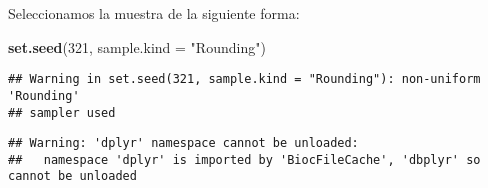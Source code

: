 \documentclass[
]{article}
\newenvironment{Shaded}{\begin{snugshade}}{\end{snugshade}}
\newcommand{\CommentTok}[1]{\textcolor[rgb]{0.56,0.35,0.01}{\textit{#1}}}
\newcommand{\DataTypeTok}[1]{\textcolor[rgb]{0.13,0.29,0.53}{#1}}
\newcommand{\DecValTok}[1]{\textcolor[rgb]{0.00,0.00,0.81}{#1}}
\newcommand{\KeywordTok}[1]{\textcolor[rgb]{0.13,0.29,0.53}{\textbf{#1}}}
\newcommand{\NormalTok}[1]{#1}
\newcommand{\OperatorTok}[1]{\textcolor[rgb]{0.81,0.36,0.00}{\textbf{#1}}}
\newcommand{\OtherTok}[1]{\textcolor[rgb]{0.56,0.35,0.01}{#1}}
\newcommand{\StringTok}[1]{\textcolor[rgb]{0.31,0.60,0.02}{#1}}
\begin{document}
Seleccionamos la muestra de la siguiente forma:

\begin{Shaded}
\begin{Highlighting}[]
\KeywordTok{set.seed}\NormalTok{(}\DecValTok{321}\NormalTok{, }\DataTypeTok{sample.kind =} \StringTok{"Rounding"}\NormalTok{)}
\end{Highlighting}
\end{Shaded}

\begin{verbatim}
## Warning in set.seed(321, sample.kind = "Rounding"): non-uniform 'Rounding'
## sampler used
\end{verbatim}

\begin{Shaded}
\end{Shaded}

\begin{verbatim}
## Warning: 'dplyr' namespace cannot be unloaded:
##   namespace 'dplyr' is imported by 'BiocFileCache', 'dbplyr' so cannot be unloaded
\end{verbatim}
\end{document}
